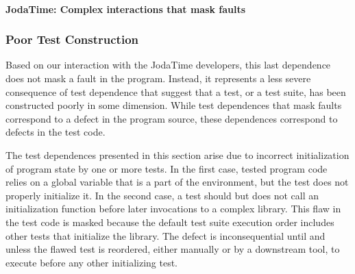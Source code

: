 \newcommand{\jodatime}{JodaTime\xspace}
\paragraph{\jodatime: Complex interactions that mask faults}
\label{sec:jodatime}


\subsubsection{Poor Test Construction}\label{sec:examples:initialization}

Based on our interaction with the \jodatime developers, this last
dependence does not
mask a fault in the program.  Instead, it represents a less severe consequence of test
dependence that suggest that a test, or a test suite, 
has been constructed poorly in some dimension.  While test dependences that mask faults
correspond to a defect
in the program source, these dependences correspond to defects in the test code.
%


The test dependences presented in this section arise due to incorrect initialization
of program state by one or more tests. In the first case,
%
tested program code relies on a
global variable that is a part of the environment, but the test does
not properly initialize it.  In the second case, a test should but
does not call
an initialization function before later invocations to a complex library.
This flaw in the test code is masked because the default test suite execution
order includes other tests that initialize the library.  The defect is
inconsequential until and unless the flawed test is reordered, either manually or by
a downstream tool, to execute before any other initializing test.


